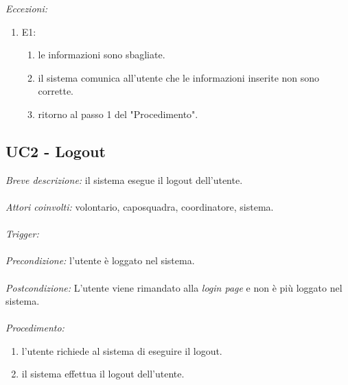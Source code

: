 \textit{Eccezioni:}
\begin{enumerate}
	\item E1:
	\begin{enumerate}
		\item le informazioni sono sbagliate.
		\item il sistema comunica all'utente che le informazioni inserite non sono corrette.
		\item ritorno al passo 1 del "Procedimento".
	\end{enumerate}
\end{enumerate}



\subsection{UC2 - Logout}
\textit{Breve descrizione:} il sistema esegue il logout dell'utente.
\\
\\
\textit{Attori coinvolti:} volontario, caposquadra, coordinatore, sistema.
\\
\\
\textit{Trigger:}
\\
\\
\textit{Precondizione:} l'utente è loggato nel sistema.
\\
\\
\textit{Postcondizione:} L'utente viene rimandato alla \textit{login page} e non è più loggato nel sistema.
\\
\\
\textit{Procedimento:}
\begin{enumerate}
	\item l'utente richiede al sistema di eseguire il logout.
	\item il sistema effettua il logout dell'utente.
\end{enumerate}


